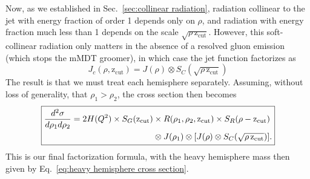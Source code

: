 \documentclass[12pt,twoside,class=../reedthesis, crop=false]{standalone}
\newcommand{\zcut}{\mathrm{z_{cut}}}
\begin{document}
	Now, as we established in Sec.~\ref{sec:collinear radiation}, radiation collinear to the jet with energy fraction of order 1 depends only on $\rho$, and radiation with energy fraction much less than 1 depends on the scale $\sqrt{\rho\,\zcut}$. However, this soft-collinear radiation only matters in the absence of a resolved gluon emission (which stops the mMDT groomer), in which case the jet function factorizes as
	\begin{equation}
		J_c(\rho, \zcut) = J(\rho) \otimes S_C(\sqrt{\rho\,\zcut})
	\end{equation}
	The result is that we must treat each hemisphere separately. Assuming, without loss of generality, that $\rho_1 > \rho_2$, the cross section then becomes
	\begin{equation}
	\boxed{
	\begin{aligned}
		\frac{d^2\sigma}{d\rho_1 d\rho_2} = 2 H(Q^2) \times S_G(\zcut) &\times R(\rho_1, \rho_2, \zcut) \times S_R(\rho - \zcut) \\
			&\otimes J(\rho_1) \otimes \qty[J(\rho) \otimes S_C(\sqrt{\rho\,\zcut})].
	\end{aligned}
	}
	\end{equation}
	This is our final factorization formula, with the heavy hemisphere mass then given by Eq.~\ref{eq:heavy hemisphere cross section}.

\ifstandalone
 

\fi
\end{document}
